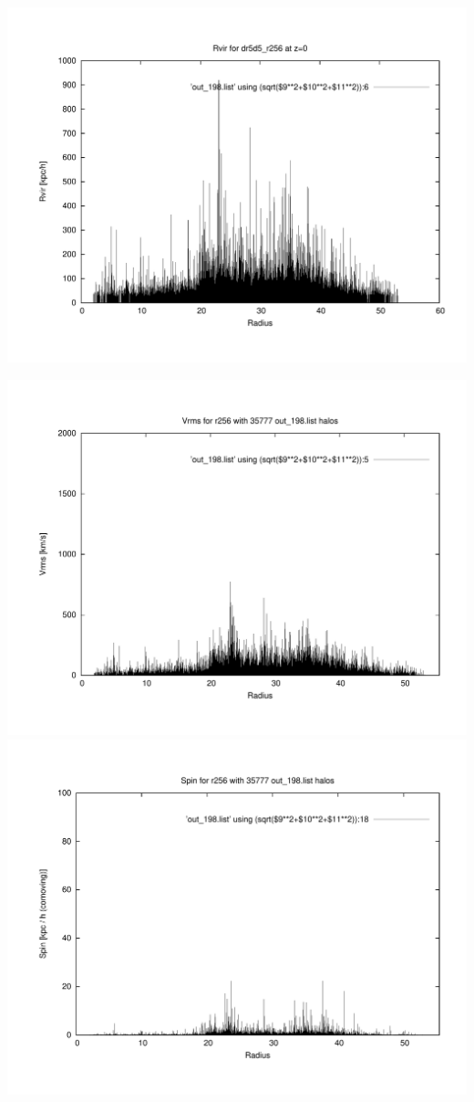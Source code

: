 \includegraphics[scale=0.3]{r256/h100/dr5d5_r256/plot_rvir_z0.pdf}

\includegraphics[scale=0.3]{r256/h100/dr5d5_r256/plot_Vrms_out_198.pdf}
\includegraphics[scale=0.3]{r256/h100/dr5d5_r256/plot_spin_out_198.pdf}

